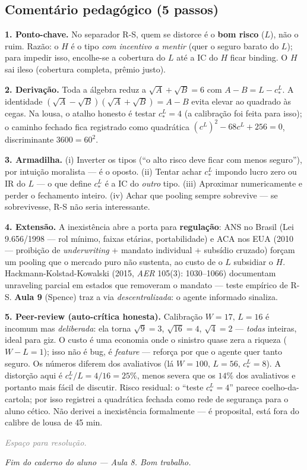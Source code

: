 \documentclass[11pt,a4paper]{article}
\newcommand{\passo}[1]{\smallskip\noindent\textbf{\textcolor{insper}{#1}}\quad}
\newif\ifsolucao
\newcommand{\espacoaluno}[1]{%
  \par\smallskip\noindent\textit{\textcolor{gray}{Espaço para resolução.}}%
  \par\vspace{#1}\noindent\textcolor{insper!30}{\hrulefill}\par\medskip}
\begin{document}
\subsection*{Comentário pedagógico (5 passos)}
\begin{gabarito}
\passo{1. Ponto-chave.} No separador R-S, quem se distorce é o \textbf{bom risco} ($L$),
não o ruim. Razão: o $H$ é o tipo \emph{com incentivo a mentir} (quer o seguro barato do
$L$); para impedir isso, encolhe-se a cobertura do $L$ até a IC do $H$ ficar binding. O $H$
sai ileso (cobertura completa, prêmio justo).

\passo{2. Derivação.} Toda a álgebra reduz a $\sqrt{A}+\sqrt{B}=6$ com $A-B=L-c^L_\ast$.
A identidade $(\sqrt{A}-\sqrt{B})(\sqrt{A}+\sqrt{B})=A-B$ evita elevar ao quadrado às cegas.
Na lousa, o atalho honesto é testar $c^L_\ast=4$ (a calibração foi feita para isso); o
caminho fechado fica registrado como quadrática $(c^L)^2-68c^L+256=0$, discriminante
$3600=60^2$.

\passo{3. Armadilha.} (i) Inverter os tipos (``o alto risco deve ficar com menos
seguro''), por intuição moralista — é o oposto. (ii) Tentar achar $c^L_\ast$ impondo
lucro zero ou IR do $L$ — o que define $c^L_\ast$ é a IC do \emph{outro} tipo. (iii)
Aproximar numericamente e perder o fechamento inteiro. (iv) Achar que pooling sempre
sobrevive — se sobrevivesse, R-S não seria interessante.

\passo{4. Extensão.} A inexistência abre a porta para \textbf{regulação}: ANS no Brasil
(Lei 9.656/1998 — rol mínimo, faixas etárias, portabilidade) e ACA nos EUA (2010 —
proibição de \emph{underwriting} + mandato individual + subsídio cruzado) forçam um pooling
que o mercado puro não sustenta, ao custo de o $L$ subsidiar o $H$. Hackmann-Kolstad-Kowalski
(2015, \emph{AER} 105(3): 1030--1066) documentam unraveling parcial em estados que
removeram o mandato — teste empírico de R-S. \textbf{Aula 9} (Spence) traz a via
\emph{descentralizada}: o agente informado sinaliza.

\passo{5. Peer-review (auto-crítica honesta).} Calibração $W=17,\,L=16$ é incomum mas
\emph{deliberada}: ela torna $\sqrt{9}=3$, $\sqrt{16}=4$, $\sqrt{4}=2$ — \emph{todas}
inteiras, ideal para giz. O custo é uma economia onde o sinistro quase zera a riqueza
($W-L=1$); isso não é bug, é \emph{feature} — reforça por que o agente quer tanto seguro.
Os números diferem dos avaliativos (lá $W=100,\,L=56,\,c^L_\ast=8$). A distorção aqui é
$c^L_\ast/L = 4/16 = 25\%$, menos severa que os $14\%$ dos avaliativos e portanto mais
fácil de discutir. Risco residual: o ``teste $c^L_\ast=4$'' parece coelho-da-cartola; por
isso registrei a quadrática fechada como rede de segurança para o aluno cético. Não
derivei a inexistência formalmente — é proposital, está fora do calibre de lousa de 45 min.
\end{gabarito}
\else
\espacoaluno{85mm}
\fi

\hrulefill
\begin{center}\small\textit{%
\ifsolucao Fim dos três exercícios de lousa — Aula 8.%
\else Fim do caderno do aluno — Aula 8. Bom trabalho.\fi}\end{center}
\end{document}

